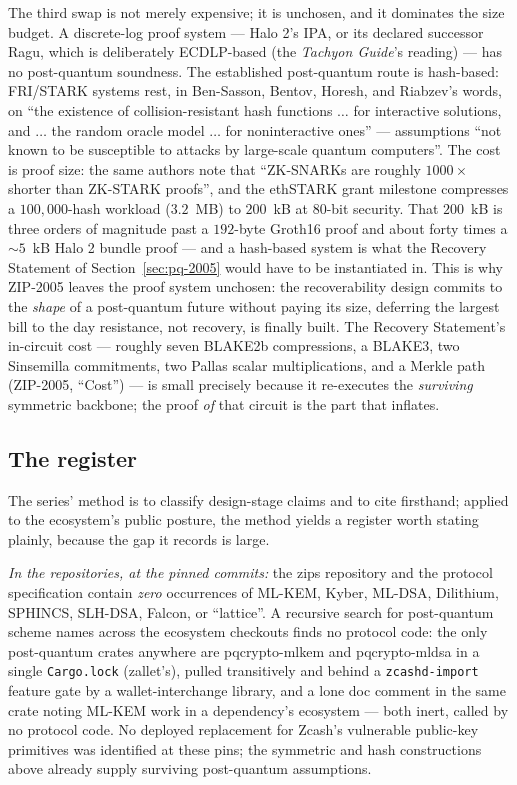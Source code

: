 \documentclass[11pt,a4paper]{article}
\theoremstyle{definition}
\begin{document}
The third swap is not merely expensive; it is unchosen, and it dominates
the size budget. A discrete-log proof system --- Halo 2's IPA, or its
declared successor Ragu, which is deliberately ECDLP-based (the
\emph{Tachyon Guide}'s reading) --- has no post-quantum soundness. The
established post-quantum route is hash-based: FRI/STARK systems rest, in
Ben-Sasson, Bentov, Horesh, and Riabzev's words, on ``the existence of
collision-resistant hash functions $\ldots$ for interactive solutions,
and $\ldots$ the random oracle model $\ldots$ for noninteractive ones''
--- assumptions ``not known to be susceptible to attacks by large-scale
quantum computers''. The cost is proof size: the same authors note that
``ZK-SNARKs are roughly $1000\times$ shorter than ZK-STARK proofs'', and
the ethSTARK grant milestone compresses a $100{,}000$-hash workload
($3.2$~MB) to $200$~kB at $80$-bit security. That $200$~kB is three
orders of magnitude past a $192$-byte Groth16 proof and about forty
times a $\sim$$5$~kB Halo 2 bundle proof --- and a hash-based system is
what the
Recovery Statement of Section~\ref{sec:pq-2005} would have to be
instantiated in. This is why ZIP-2005 leaves the proof system unchosen:
the recoverability design commits to the \emph{shape} of a
post-quantum future without paying its size, deferring the largest bill
to the day resistance, not recovery, is finally built. The Recovery
Statement's in-circuit cost --- roughly seven BLAKE2b compressions, a
BLAKE3, two Sinsemilla commitments, two Pallas scalar multiplications,
and a Merkle path (ZIP-2005, ``Cost'') --- is small precisely
because it re-executes the \emph{surviving} symmetric backbone; the
proof \emph{of} that circuit is the part that inflates.

\subsection{The register}\label{sec:pq-register}

The series' method is to classify design-stage claims and to cite
firsthand; applied to the ecosystem's public posture, the method yields
a register worth stating plainly, because the gap it records is large.

\emph{In the repositories, at the pinned commits:} the zips repository
and the protocol specification contain \emph{zero} occurrences of
ML-KEM, Kyber, ML-DSA, Dilithium, SPHINCS, SLH-DSA, Falcon, or
``lattice''. A recursive search for post-quantum scheme names across
the ecosystem checkouts finds no protocol code: the only post-quantum
crates anywhere are \textsf{pqcrypto-mlkem} and \textsf{pqcrypto-mldsa}
in a single \texttt{Cargo.lock} (\textsf{zallet}'s), pulled
transitively and behind a \texttt{zcashd-import} feature gate by a
wallet-interchange library, and a lone doc comment in the same crate
noting ML-KEM work in a dependency's ecosystem --- both inert, called
by no protocol code. No deployed replacement for Zcash's vulnerable
public-key primitives was identified at these pins; the symmetric and hash
constructions above already supply surviving post-quantum assumptions.
\end{document}
